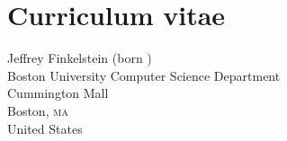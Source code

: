 \chapter{Curriculum vitae}
Jeffrey Finkelstein (born )\\[5ex]
%
Boston University Computer Science Department\\
 Cummington Mall\\
Boston, \textsc{ma} \\
United States
